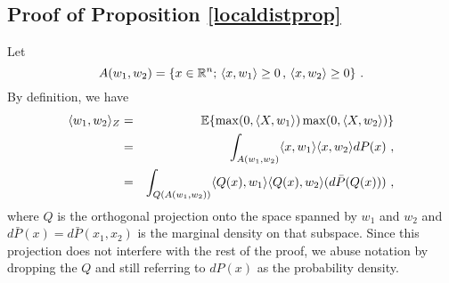 


\subsection{Proof of Proposition \ref{localdistprop}}

Let 
$$A(w_1, w_2) = \{ x \in {\mathbb{R}}^n; \, \langle x, w_1 \rangle \geq 0\,,\, \langle x, w_2 \rangle \geq 0\}~.$$
By definition, we have 
\begin{eqnarray}
\label{col1}
\langle w_1, w_2 \rangle_Z &=& {\mathbb{E}} \{ \max(0, \langle X, w_1 \rangle ) \max(0, \langle X, w_2 \rangle ) \} \\
&=& \int_{A(w_1, w_2)} \langle x, w_1 \rangle  \langle x, w_2 \rangle dP(x)~, \\
&=& \int_{Q({A}(w_1, w_2))}  \langle Q(x), w_1 \rangle  \langle Q(x), w_2 \rangle (d\bar{P}(Q(x)))~,  
\end{eqnarray}
where $Q$ is the orthogonal projection onto the space spanned by $w_1$ and $w_2$ and
 $d\bar{P}(x)=d\bar{P}(x_1, x_2)$ is the marginal density on that subspace. 
 Since this projection does not interfere with the rest of the proof, we abuse notation by dropping the $Q$ and still referring to $dP(x)$ as the probability density.

